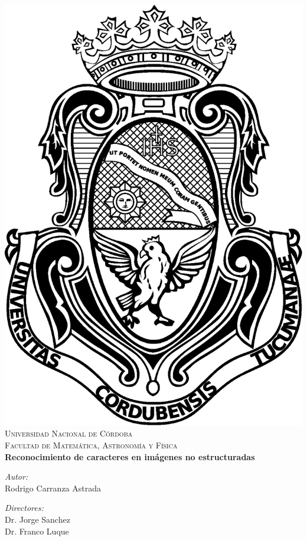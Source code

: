 \begin{titlepage}
	\begin{center}
		\includegraphics[scale=0.23]{img/escudoUNC.eps}\\[1cm]
		\textsc{\LARGE Universidad Nacional de C\'{o}rdoba}\\[0.5cm]
		\textsc{\Large Facultad de Matem\'{a}tica, Astronom\'{i}a y F\'{i}sica}\\[3.5cm]
	
			{\doublespacing \LARGE \bfseries
				Reconocimiento de caracteres en im\'{a}genes no estructuradas
			} \\[4.5cm]

			
		\begin{minipage}{0.4\textwidth}
			\begin{flushleft} \large
				\emph{Autor:}\\
					Rodrigo Carranza Astrada
			\end{flushleft}
			\end{minipage}
			\begin{minipage}{0.4\textwidth}
				\begin{flushright} \large
					\emph{Directores:} \\
						Dr. Jorge Sanchez\\
						Dr. Franco Luque
				\end{flushright}
			\end{minipage}
	
			\vfill
		\end{center}
\end{titlepage}
